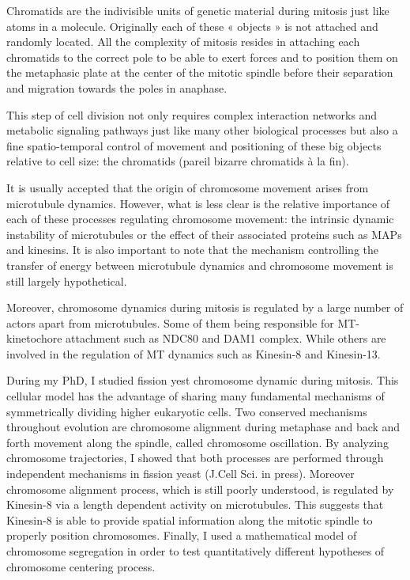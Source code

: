 \documentclass[12pt,a4paper,twoside,openright]{book}
\begin{document}
Chromatids are the indivisible units of genetic material during mitosis
just like atoms in a molecule. Originally each of these « objects » is
not attached and randomly located. All the complexity of mitosis resides
in attaching each chromatids to the correct pole to be able to exert
forces and to position them on the metaphasic plate at the center of the
mitotic spindle before their separation and migration towards the poles
in anaphase.

This step of cell division not only requires complex interaction
networks and metabolic signaling pathways just like many other
biological processes but also a fine spatio-temporal control of movement
and positioning of these big objects relative to cell size: the
chromatids (pareil bizarre chromatids à la fin).

It is usually accepted that the origin of chromosome movement arises
from microtubule dynamics. However, what is less clear is the relative
importance of each of these processes regulating chromosome movement:
the intrinsic dynamic instability of microtubules or the effect of their
associated proteins such as MAPs and kinesins. It is also important to
note that the mechanism controlling the transfer of energy between
microtubule dynamics and chromosome movement is still largely
hypothetical.

Moreover, chromosome dynamics during mitosis is regulated by a large
number of actors apart from microtubules. Some of them being responsible
for MT-kinetochore attachment such as NDC80 and DAM1 complex. While
others are involved in the regulation of MT dynamics such as Kinesin-8
and Kinesin-13.

During my PhD, I studied fission yest chromosome dynamic during mitosis.
This cellular model has the advantage of sharing many fundamental
mechanisms of symmetrically dividing higher eukaryotic cells. Two
conserved mechanisms throughout evolution are chromosome alignment
during metaphase and back and forth movement along the spindle, called
chromosome oscillation. By analyzing chromosome trajectories, I showed
that both processes are performed through independent mechanisms in
fission yeast (J.Cell Sci. in press). Moreover chromosome alignment
process, which is still poorly understood, is regulated by Kinesin-8 via
a length dependent activity on microtubules. This suggests that
Kinesin-8 is able to provide spatial information along the mitotic
spindle to properly position chromosomes. Finally, I used a mathematical
model of chromosome segregation in order to test quantitatively
different hypotheses of chromosome centering process.
\end{document}
